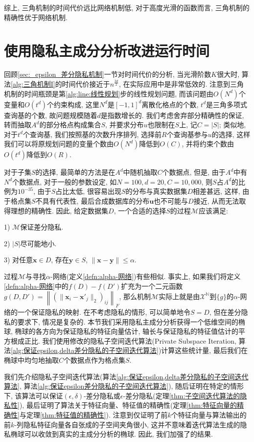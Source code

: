 综上, 三角机制的时间代价远比网络机制低, 对于高度光滑的函数而言, 三角机制的精确性优于网络机制.
\section{使用隐私主成分分析改进运行时间} %
\label{sec:使用隐私主成分分析改进运行时间}
回顾\ref{sec:_epsilon_差分隐私机制}一节对时间代价的分析, 当光滑阶数$K$很大时, 算法\ref{alg:三角机制I}的时间代价接近于$n^{\frac{3d}{2}}$, 在实际应用中是非常低效的. 注意到三角机制的时间瓶颈是第\ref{alg:line:线性规划}步的线性规划问题, 而该问题由$O(N^d)$个变量和$O(t^d)$个约束构成, 这里$N^d$是$[-1, 1]^d$离散化格点的个数, $t^d$是三角多项式查询基的个数, 故问题规模随着$d$是指数增长的. 我们考虑舍弃部分精确性的保证, 转而抽取$A^d$的部分格点构成集合$S$, 并要求分布$u$也限制在$S$上, 记$C = |S|$; 类似地, 对于$t^d$个查询基, 我们按照基的次数升序排列, 选择前$R$个查询基参与$u$的选择, 这样我们可以将原规划问题的变量个数由$O(N^d)$降低到$O(C)$, 并将约束个数由$O(t^d)$降低到$O(R)$. 

对于子集$S$的选择, 最简单的方法是在$A^d$中随机抽取$C$个数据点, 但是, 由于$A^d$中有$N^d$个数据点, 对于一般的参数设定, 如$N = 100, d= 20, C = 10,000$, 则$S$占$A^d$的比例为$10^{-35}$, 由于$S$占比太低, 很容易出现$S$的分布与真实数据集$D$相差甚远, 这样, 由于格点集$S$不具有代表性, 最后合成数据库的分布$\mathbf{u}$也不可能与$D$接近, 从而无法取得理想的精确性. 因此, 给定数据集$D$, 一个合适的选择$S$的过程$\mathcal{M}$应该满足:

1) $\mathcal{M}$保证差分隐私.

2) $|S|$尽可能地小.

3) 对任意$\mathbf{x}\in D$, 存在$\mathbf{y}\in S$, $\|\mathbf{x} - \mathbf{y}\|\le\alpha$.

过程$\mathcal{M}$与寻找$\alpha$-网络(定义\ref{defn:alpha-网络})有些相似. 事实上, 如果我们将定义\ref{defn:alpha-网络}中的$f(D) - f(D')$扩充为一个二元函数$g(D, D') = \left\|\left(\|\mathbf{x}_i - \mathbf{x}'_j\|_2\right)_{ij}\right\|_F$, 那么机制$\mathcal{M}$实际上就是由$\mathcal{X}^{\mathbb N}$到$\{g\}$的$\alpha$-网络的一个保证隐私的映射. 在不考虑隐私的情形, 可以简单地令$S = D$, 但在差分隐私的要求下, 情况是复杂的. 本节我们采用隐私主成分分析获得一个低维空间的椭球, 椭球的各方向为保证隐私的特征向量估计, 轴长与保证隐私的特征值估计的平方根成正比. 我们使用修改的隐私子空间迭代算法(Private Subspace Iteration, 算法\ref{alg:保证epsilon,delta差分隐私的子空间迭代算法})计算这些统计量, 最后我们在椭球中均匀地抽取$C$个数据点作为格点集$S$. 

我们先介绍隐私子空间迭代算法(算法\ref{alg:保证epsilon,delta差分隐私的子空间迭代算法}, 算法\ref{alg:保证epsilon差分隐私的子空间迭代算法}), 随后证明在特定的情形下, 该算法可以保证$(\epsilon, \delta)$-差分隐私或$\epsilon$-差分隐私(定理\ref{thm:子空间迭代算法的隐私性}), 最后证明了算法关于特征向量、特征值的精确性(定理\ref{thm:特征向量的精确性}与定理\ref{thm:特征值的精确性}). 注意到\parencite{hardt2013robust}仅证明了前$k$个特征向量与算法输出的前$k$-列隐私特征向量各自张成的子空间夹角很小, 这并不意味着迭代算法生成的隐私椭球可以收敛到真实的主成分分析的椭球. 因此, 我们加强了\parencite{hardt2013robust}的结果.

